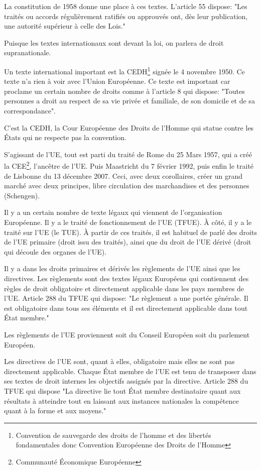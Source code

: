 \documentclass[12pt, a4paper, openany]{book}
\begin{document}
La constitution de 1958 donne une place à ces textes. L'article 55 dispose: "Les traités ou accords régulièrement ratifiés ou approuvés ont, dès leur publication, une autorité supérieur à celle des Lois."

Puisque les textes internationaux sont devant la loi, on parlera de droit supranationale. 

Un texte international important est la CEDH\footnote{Convention de sauvegarde des droits de l'homme et des libertés fondamentales donc Convention Européenne des Droits de l'Homme} signée le 4 novembre 1950. Ce texte n'a rien à voir avec l'Union Européenne. Ce texte est important car proclame un certain nombre de droits comme à l'article 8 qui dispose: "Toutes personnes a droit au respect de sa vie privée et familiale, de son domicile et de sa correspondance".

C'est la CEDH, la Cour Européenne des Droits de l'Homme qui statue contre les États qui ne respecte pas la convention. 

S'agissant de l'UE, tout est parti du traité de Rome du 25 Mars 1957, qui a créé la CEE\footnote{Communauté Économique Européenne}, l'ancêtre de l'UE. Puis Maastricht du 7 février 1992, puis enfin le traité de Lisbonne du 13 décembre 2007. Ceci, avec deux corollaires, créer un grand marché avec deux principes, libre circulation des marchandises et des personnes (Schengen).

Il y a un certain nombre de texte légaux qui viennent de l'organisation Européenne. Il y a le traité de fonctionnement de l'UE (TFUE). À côté, il y a le traité sur l'UE (le TUE). À partir de ces traités, il est habituel de parlé des droits de l'UE primaire (droit issu des traités), ainsi que du droit de l'UE dérivé (droit qui découle des organes de l'UE).

Il y a dans les droits primaires et dérivés les règlements de l'UE ainsi que les directives. Les règlements sont des textes légaux Européens qui contiennent des règles de droit obligatoire et directement applicable dans les pays membres de l'UE. Article 288 du TFUE qui dispose: "Le règlement a une portée générale. Il est obligatoire dans tous ses éléments et il est directement applicable dans tout État membre."

Les règlements de l'UE proviennent soit du Conseil Européen soit du parlement Européen.

Les directives de l'UE sont, quant à elles, obligatoire mais elles ne sont pas directement applicable. Chaque État membre de l'UE est tenu de transposer dans ses textes de droit internes les objectifs assignés par la directive. Article 288 du TFUE qui dispose "La directive lie tout État membre destinataire quant aux résultats à atteindre tout en laissant aux instances nationales la compétence quant à la forme et aux moyens."
\end{document}
